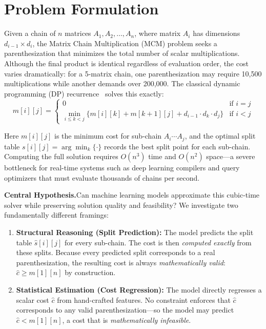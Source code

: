 \documentclass[conference]{IEEEtran}
\begin{document}
\section{Problem Formulation}
\label{sec:formulation}

Given a chain of $n$ matrices $A_1, A_2, \ldots, A_n$, where matrix $A_i$ has dimensions $d_{i-1} \times d_i$, the Matrix Chain Multiplication (MCM) problem seeks a parenthesization that minimizes the total number of scalar multiplications. Although the final product is identical regardless of evaluation order, the cost varies dramatically: for a 5-matrix chain, one parenthesization may require 10,500 multiplications while another demands over 200,000. The classical dynamic programming (DP) recurrence~\cite{b4} solves this exactly:
\begin{equation}
\label{eq:dp}
m[i][j] = \begin{cases}
0 & \text{if } i = j \\
\displaystyle\min_{i \leq k < j} \bigl\{ m[i][k] + m[k{+}1][j] + d_{i-1} \cdot d_k \cdot d_j \bigr\} & \text{if } i < j
\end{cases}
\end{equation}

Here $m[i][j]$ is the minimum cost for sub-chain $A_i \cdots A_j$, and the optimal split table $s[i][j] = \arg\min_k\{\cdot\}$ records the best split point for each sub-chain. Computing the full solution requires $O(n^3)$ time and $O(n^2)$ space---a severe bottleneck for real-time systems such as deep learning compilers and query optimizers that must evaluate thousands of chains per second.

\medskip
\noindent\textbf{Central Hypothesis.}\quad Can machine learning models approximate
this cubic-time solver while preserving solution quality and feasibility?
We investigate two fundamentally different framings:

\begin{enumerate}
\item \textbf{Structural Reasoning (Split Prediction):} The model predicts the
split table $\hat{s}[i][j]$ for every sub-chain. The cost is then \emph{computed
exactly} from these splits. Because every predicted split corresponds to a real
parenthesization, the resulting cost is always \emph{mathematically valid}:
$\hat{c} \geq m[1][n]$ by construction.

\item \textbf{Statistical Estimation (Cost Regression):} The model directly
regresses a scalar cost $\hat{c}$ from hand-crafted features. No constraint
enforces that $\hat{c}$ corresponds to any valid parenthesization---so the model
may predict $\hat{c} < m[1][n]$, a cost that is \emph{mathematically infeasible}.
\end{enumerate}
\end{document}
